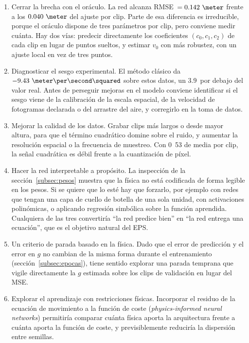 \documentclass[titlepage,11pt]{article}
\providecommand{\num}[1]{\ensuremath{#1}}
\providecommand{\SI}[2]{#1\,#2}
\providecommand{\percent}{\char37\relax}
\begin{document}
\begin{enumerate}
\item Cerrar la brecha con el oráculo. La red alcanza
  RMSE~$=\num{0.142}~\meter$ frente a los $\num{0.040}~\meter$ del ajuste por
  clip. Parte de esa diferencia es irreducible, porque el oráculo dispone de tres
  parámetros por clip, pero conviene medir cuánta. Hay dos vías: predecir
  directamente los coeficientes $(c_0,c_1,c_2)$ de cada clip en lugar de puntos
  sueltos, y estimar $v_0$ con más robustez, con un ajuste local en vez de tres
  puntos.

\item Diagnosticar el sesgo experimental. El método clásico da
  $\num{-9.43}~\meter\per\second\squared$ sobre estos datos, un
  \SI{3.9}{\percent} por debajo del valor real. Antes de perseguir mejoras en el
  modelo conviene identificar si el sesgo viene de la calibración de la escala
  espacial, de la velocidad de fotogramas declarada o del arrastre del aire, y
  corregirlo en la toma de datos.

\item Mejorar la calidad de los datos. Grabar clips más largos o desde
  mayor altura, para que el término cuadrático domine sobre el ruido, y aumentar
  la resolución espacial o la frecuencia de muestreo. Con \unit{0.53}{\second} de
  media por clip, la señal cuadrática es débil frente a la cuantización de píxel.

\item Hacer la red interpretable a propósito. La inspección de la
  sección~\ref{subsec:pesos} muestra que la física no está codificada de forma
  legible en los pesos. Si se quiere que lo esté hay que forzarlo, por ejemplo
  con redes que tengan una capa de cuello de botella de una sola unidad, con
  activaciones polinómicas, o aplicando regresión simbólica sobre la función
  aprendida. Cualquiera de las tres convertiría \enquote{la red predice bien} en
  \enquote{la red entrega una ecuación}, que es el objetivo natural del EPS.

\item Un criterio de parada basado en la física. Dado que el error de
  predicción y el error en $g$ no cambian de la misma forma durante el entrenamiento
  (sección~\ref{subsec:epocas}), tiene sentido explorar una parada temprana que
  vigile directamente la $g$ estimada sobre los clips de validación en lugar del
  MSE.

\item Explorar el aprendizaje con restricciones físicas. Incorporar el
  residuo de la ecuación de movimiento a la función de coste (\emph{physics-informed
  neural networks}) permitiría comparar cuánta física aporta la arquitectura
  frente a cuánta aporta la función de coste, y previsiblemente reduciría la
  dispersión entre semillas.


\end{enumerate}
\end{document}

